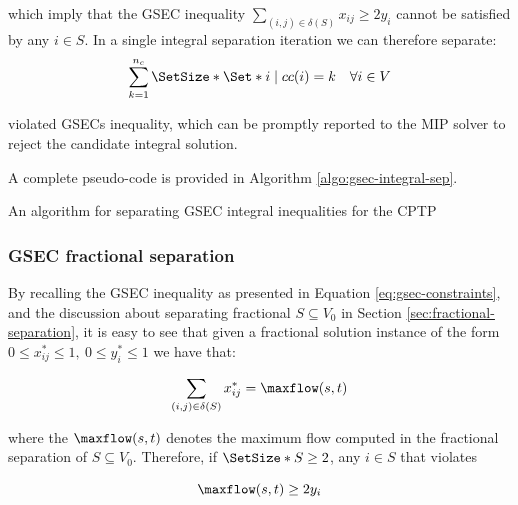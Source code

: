 which imply that the GSEC inequality $\sum_{(i, j) \in \delta(S)} x_{ij} \ge 2 y_i$ cannot be satisfied by any $i \in S$.
In a single integral separation iteration we can therefore separate:
\begin{equation}
	\sum^{n_c}_{k = 1} \SetSize*{ \Set*{ i \mid cc(i) = k \quad \forall i \in V } }
\end{equation}

violated GSECs inequality, which can be promptly reported to the MIP solver to reject the candidate integral solution.

A complete pseudo-code is provided in Algorithm \ref{algo:gsec-integral-sep}.

\begin{algorithm}
	\caption{An algorithm for separating GSEC integral inequalities for the CPTP}
	\label{algo:gsec-integral-sep}
	
\end{algorithm}

\subsubsection{GSEC fractional separation}
\label{sec:impl-gsec-fractional-separation}

By recalling the GSEC inequality as presented in Equation \eqref{eq:gsec-constraints}, and the discussion about separating fractional $S \subseteq V_0$ in Section \ref{sec:fractional-separation}, it is easy to see that given a fractional solution instance of the form $0 \le x^*_{ij} \le 1,\ 0 \le y^*_{i} \le 1$ we have that:

\begin{equation}
	\sum_{(i, j) \in \delta(S)} x^*_{ij} = \maxflow(s, t)
\end{equation}

where the $\maxflow(s, t)$ denotes the maximum flow computed in the fractional separation of $S \subseteq V_0$.
Therefore, if $\SetSize*{S} \ge 2$, any $i \in S$ that violates

\begin{equation}
	\maxflow(s, t) \ge 2 y_i
\end{equation}

